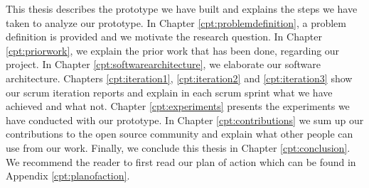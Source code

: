 This thesis describes the prototype we have built and explains the steps we have taken to analyze our prototype. In Chapter \ref{cpt:problemdefinition}, a problem definition is provided and we motivate the research question. In Chapter \ref{cpt:priorwork}, we explain the prior work that has been done, regarding our project. In Chapter \ref{cpt:softwarearchitecture}, we elaborate our software architecture. Chapters \ref{cpt:iteration1}, \ref{cpt:iteration2} and \ref{cpt:iteration3} show our scrum iteration reports and explain in each scrum sprint what we have achieved and what not. Chapter \ref{cpt:experiments} presents the experiments we have conducted with our prototype. In Chapter \ref{cpt:contributions} we sum up our contributions to the open source community and explain what other people can use from our work. Finally, we conclude this thesis in Chapter \ref{cpt:conclusion}. We recommend the reader to first read our plan of action which can be found in Appendix \ref{cpt:planofaction}.
